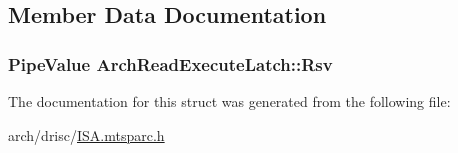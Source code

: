 \subsection{Member Data Documentation}
\hypertarget{struct_arch_read_execute_latch_a243ee741c2e308c35d710c815397c6a9}{
\subsubsection[{Rsv}]{\setlength{\rightskip}{0pt plus 5cm}Pipe\+Value Arch\+Read\+Execute\+Latch\+::\+Rsv}}\label{struct_arch_read_execute_latch_a243ee741c2e308c35d710c815397c6a9}


The documentation for this struct was generated from the following file\+:\begin{DoxyCompactItemize}
\item 
arch/drisc/\hyperlink{_i_s_a_8mtsparc_8h}{I\+S\+A.\+mtsparc.\+h}\end{DoxyCompactItemize}
